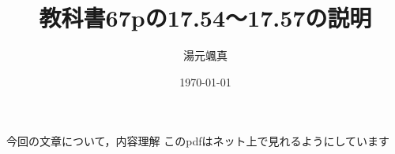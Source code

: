 \documentclass{jsarticle}
\title{教科書67pの17.54〜17.57の説明}
\author{湯元颯真}
\date{\today}
\numberwithin{equation}{section}
\theoremstyle{definition}
\begin{document}
今回の文章について，内容理解
このpdfはネット上で見れるようにしています
\maketitle
\end{document}
